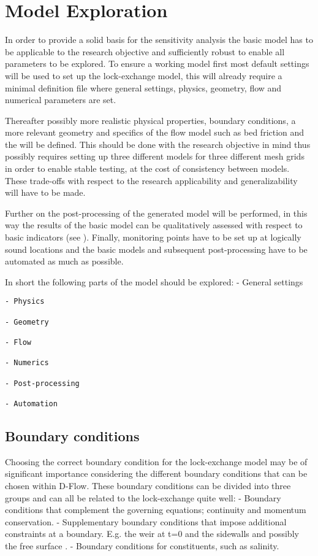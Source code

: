 \chapter{Model Exploration}\label{model-exploration}

In order to provide a solid basis for the sensitivity analysis the basic
model has to be applicable to the research objective and sufficiently
robust to enable all parameters to be explored. To ensure a working
model first most default settings will be used to set up the
lock-exchange model, this will already require a minimal definition file
where general settings, physics, geometry, flow and numerical parameters
are set.

Thereafter possibly more realistic physical properties, boundary
conditions, a more relevant geometry and specifics of the flow model
such as bed friction and the will be defined. This should be done with
the research objective in mind thus possibly requires setting up three
different models for three different mesh grids in order to enable
stable testing, at the cost of consistency between models. These
trade-offs with respect to the research applicability and
generalizability will have to be made.

Further on the post-processing of the generated model will be performed,
in this way the results of the basic model can be qualitatively assessed
with respect to basic indicators (see \citet{indicator-parameters}).
Finally, monitoring points have to be set up at logically sound
locations and the basic models and subsequent post-processing have to be
automated as much as possible.

In short the following parts of the model should be explored: - General
settings

\begin{verbatim}
- Physics

- Geometry

- Flow

- Numerics

- Post-processing

- Automation
\end{verbatim}

\section{Boundary conditions}\label{boundary-conditions}

Choosing the correct boundary condition for the lock-exchange model may
be of significant importance considering the different boundary
conditions that can be chosen within D-Flow. These boundary conditions
can be divided into three groups and can all be related to the
lock-exchange quite well: - Boundary conditions that complement the
governing equations; continuity and momentum conservation. -
Supplementary boundary conditions that impose additional constraints at
a boundary. E.g. the weir at t=0 and the sidewalls and possibly the free
surface \citep{Adduce2012}. - Boundary conditions for constituents, such
as salinity.

